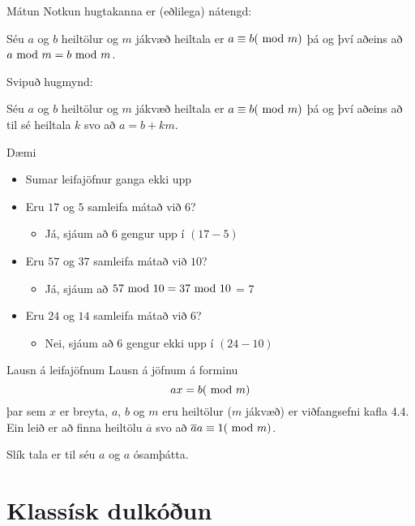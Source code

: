 \documentclass[handout]{beamer}
\begin{document}
\begin{frame}{Mátun}
    Notkun hugtakanna er (eðlilega) nátengd:
    \begin{tcolorbox}
        Séu $a$ og $b$ heiltölur og $m$ jákvæð heiltala er $a \equiv b (\ \text{mod}\ m)$ þá og því aðeins að $a \ \text{mod}\ m = b \ \text{mod}\ m$.
    \end{tcolorbox}
    Svipuð hugmynd:
    \begin{tcolorbox}
        Séu $a$ og $b$ heiltölur og $m$ jákvæð heiltala er $a \equiv b (\ \text{mod}\ m)$ þá og því aðeins að til sé heiltala $k$ svo að $a = b + km$.
    \end{tcolorbox}
\end{frame}

\begin{frame}{Dæmi}
    \begin{itemize}
        \item Sumar leifajöfnur ganga ekki upp
        \item Eru $17$ og $5$ samleifa mátað við $6$? \pause
        \begin{itemize}
            \item Já, sjáum að 6 gengur upp í $(17-5)$
        \end{itemize}
        \item Eru $57$ og $37$ samleifa mátað við $10$? \pause
        \begin{itemize}
            \item Já, sjáum að $57 \ \text{mod}\ 10 = 37 \ \text{mod}\ 10$ = 7
        \end{itemize}
        \item Eru $24$ og $14$ samleifa mátað við $6$? \pause
        \begin{itemize}
            \item Nei, sjáum að 6 gengur ekki upp í $(24-10)$
        \end{itemize}
    \end{itemize}    
\end{frame}

\begin{frame}{Lausn á leifajöfnum}
    Lausn á jöfnum á forminu 
    \[
        ax = b(\ \text{mod}\ m)
    \]
    þar sem $x$ er breyta, $a$, $b$ og $m$ eru heiltölur ($m$ jákvæð) er viðfangsefni kafla 4.4. Ein leið er að finna heiltölu $\overline{a}$ svo að $\overline{a}a \equiv 1 (\ \text{mod}\ m)$. 
    
    Slík tala er til séu $a$ og $a$ ósamþátta.
\end{frame}

\section{Klassísk dulkóðun}
\end{document}
